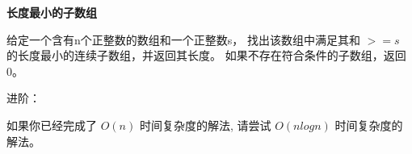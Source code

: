 \textbf{长度最小的子数组}\par

给定一个含有n个正整数的数组和一个正整数s，
找出该数组中满足其和 $ >= s $ 的长度最小的连续子数组，并返回其长度。
如果不存在符合条件的子数组，返回 0。\par

进阶：\par

如果你已经完成了 $ O(n) $ 时间复杂度的解法, 请尝试 $ O(n log n) $ 时间复杂度的解法。\par
